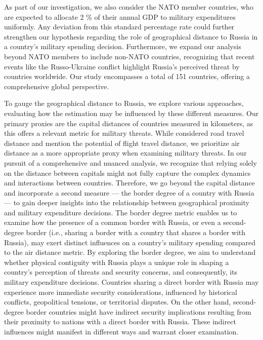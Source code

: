 \documentclass[12pt,a4paper]{article}
\begin{document}
As part of our investigation, we also consider the NATO member countries, who are expected to allocate 2 \% of their annual GDP to military expenditures uniformly. Any deviation from this standard percentage rate could further strengthen our hypothesis regarding the role of geographical distance to Russia in a country's military spending decision. Furthermore, we expand our analysis beyond NATO members to include non-NATO countries, recognizing that recent events like the Russo-Ukraine conflict highlight Russia's perceived threat by countries worldwide. Our study encompasses a total of 151 countries, offering a comprehensive global perspective. 

To gauge the geographical distance to Russia, we explore various approaches, evaluating how the estimation may be influenced by these different measures. Our primary proxies are the capital distances of countries measured in kilometers, as this offers a relevant metric for military threats. While \citet{kofrovn2023} considered road travel distance and mention the potential of flight travel distance, we prioritize air distance as a more appropriate proxy when examining military threats. 
In our pursuit of a comprehensive and nuanced analysis, we recognize that relying solely on the distance between capitals might not fully capture the complex dynamics and interactions between countries. Therefore, we go beyond the capital distance and incorporate a second measure — the border degree of a country with Russia — to gain deeper insights into the relationship between geographical proximity and military expenditure decisions. The border degree metric enables us to examine how the presence of a common border with Russia, or even a second-degree border (i.e., sharing a border with a country that shares a border with Russia), may exert distinct influences on a country's military spending compared to the air distance metric. By exploring the border degree, we aim to understand whether physical contiguity with Russia plays a unique role in shaping a country's perception of threats and security concerns, and consequently, its military expenditure decisions. Countries sharing a direct border with Russia may experience more immediate security considerations, influenced by historical conflicts, geopolitical tensions, or territorial disputes. On the other hand, second-degree border countries might have indirect security implications resulting from their proximity to nations with a direct border with Russia. These indirect influences might manifest in different ways and warrant closer examination.
\end{document}
